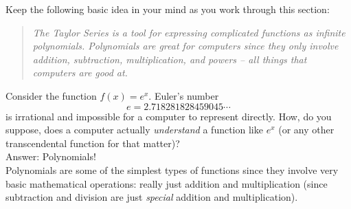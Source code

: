 Keep the following basic idea in your mind as you work through this section: 
\begin{quote}
    {\it The
        Taylor Series is a tool for expressing complicated functions as infinite polynomials.
        Polynomials are great for computers since they only involve addition, subtraction,
    multiplication, and powers -- all things that computers are good at.}
\end{quote}

Consider the function $f(x) = e^x$.  Euler's number
\[ e = 2.718281828459045\cdots \]
is irrational and
impossible for a computer to represent directly.  How, do you suppose, does
a computer actually {\it understand} a function like $e^x$ (or any other
transcendental function for that matter)? \\
Answer: Polynomials! \\
Polynomials are some of the simplest types of functions since they involve very basic
mathematical operations: really just addition and multiplication (since subtraction
and division are just {\it special} addition and multiplication).  

